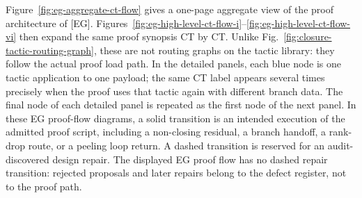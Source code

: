 \documentclass[
  11pt,
]{article}
\theoremstyle{definition}
\begin{document}
Figure~\ref{fig:eg-aggregate-ct-flow} gives a one-page aggregate view of
the proof architecture of {[}EG{]}.  Figures~\ref{fig:eg-high-level-ct-flow-i}--\ref{fig:eg-high-level-ct-flow-vi}
then expand the same proof synopsis CT by CT\@.  Unlike
Fig.~\ref{fig:closure-tactic-routing-graph}, these are
not routing graphs on the tactic library: they follow the actual proof
load path.  In the detailed panels, each blue node is one tactic
application to one payload; the same CT label appears several times
precisely when the proof uses that tactic again with different branch
data.  The final node of each detailed panel is repeated as the first
node of the next panel.  In these EG proof-flow diagrams, a solid
transition is an intended execution of the admitted proof script, including
a non-closing residual, a branch handoff, a rank-drop route, or a peeling
loop return.  A dashed transition is reserved for an audit-discovered
design repair.  The displayed EG proof flow has no dashed repair
transition: rejected proposals and later repairs belong to the defect
register, not to the proof path.
\end{document}
